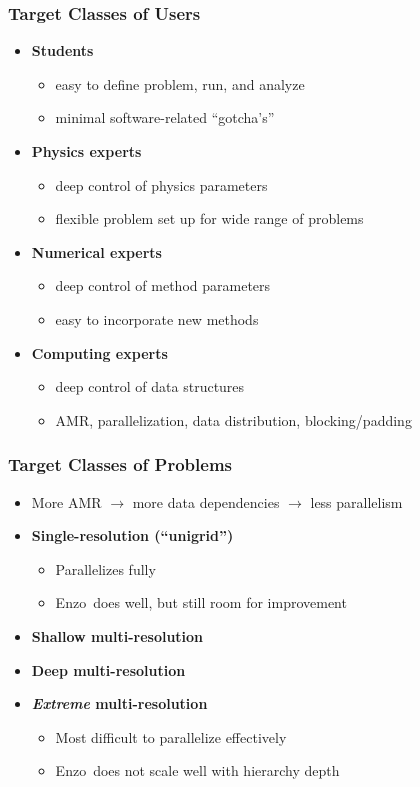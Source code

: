 \documentclass{beamer}
\newcommand{\enzo}{\textsf{Enzo}}
\begin{document}
\begin{frame}
\frametitle{Target Classes of Users}
\begin{itemize}
\item \textbf{Students}
\begin{itemize}
\item easy to define problem, run, and analyze
\item minimal software-related ``gotcha's''
\end{itemize}
\item \textbf{Physics experts}
\begin{itemize}
\item deep control of physics parameters
\item flexible problem set up for wide range of problems
\end{itemize}
\item \textbf{Numerical experts}
\begin{itemize}
\item deep control of method parameters
\item easy to incorporate new methods
\end{itemize}
\item \textbf{Computing experts}
\begin{itemize}
\item deep control of data structures
\item AMR, parallelization, data distribution, blocking/padding
\end{itemize}
\end{itemize}
\end{frame}

\begin{frame}
\frametitle{Target Classes of Problems}

\begin{itemize}
\item More AMR $\rightarrow$ more data dependencies $\rightarrow$ less parallelism
\item \textbf{Single-resolution (``unigrid'')}
\begin{itemize}
\item Parallelizes fully
\item \enzo\ does well, but still room for improvement
\end{itemize}
\item \textbf{Shallow multi-resolution}
\item \textbf{Deep multi-resolution}
\item \textbf{\textit{Extreme} multi-resolution}
\begin{itemize}
\item Most difficult to parallelize effectively
\item \enzo\ does not scale well with hierarchy depth
\end{itemize}
\end{itemize}
\end{frame}
\end{document}
